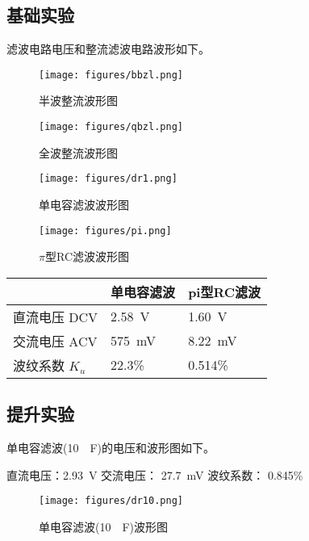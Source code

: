 \documentclass{article}
\begin{document}
\subsection*{基础实验}滤波电路电压和整流滤波电路波形如下。
\begin{figure*}[h]
    \centering
    \begin{minipage}[t]{0.48\textwidth}
        \centering
        \texttt{[image: figures/bbzl.png]}
        \caption{半波整流波形图}
    \end{minipage}
    \begin{minipage}[t]{0.48\textwidth}
        \centering
        \texttt{[image: figures/qbzl.png]}
        \caption{全波整流波形图}
    \end{minipage}
\end{figure*}
\begin{figure*}[h]
    \centering
    \begin{minipage}[t]{0.48\textwidth}
        \centering
        \texttt{[image: figures/dr1.png]}
        \caption{单电容滤波波形图}
    \end{minipage}
    \begin{minipage}[t]{0.48\textwidth}
        \centering
        \texttt{[image: figures/pi.png]}
        \caption{$\pi$型RC滤波波形图}
    \end{minipage}
\end{figure*}

\begin{table}[htbp]
    \centering
    \begin{tabular}{|l|l|l|}
        \hline
             & 单电容滤波        & pi型RC滤波 \bigstrut \\
        \hline
        直流电压 DCV& \SI{2.58}{V} & \SI{1.60}{V}      \\
        \hline
        交流电压 ACV& \SI{575}{mV} & \SI{8.22}{mV}     \\
        \hline
        波纹系数 $K_u$ & 22.3\%       & 0.514\%           \\
        \hline
    \end{tabular}
\end{table}%

\subsection*{提升实验}
单电容滤波(\SI{10}{\mu F})的电压和波形图如下。

直流电压：\SI{2.93}{V} 交流电压： \SI{27.7}{mV}  波纹系数： 0.845\%
\begin{figure*}[htbp]
    
    \centering
    \texttt{[image: figures/dr10.png]}
    \caption{单电容滤波(\SI{10}{\mu F})波形图}

\end{figure*}
\end{document}
